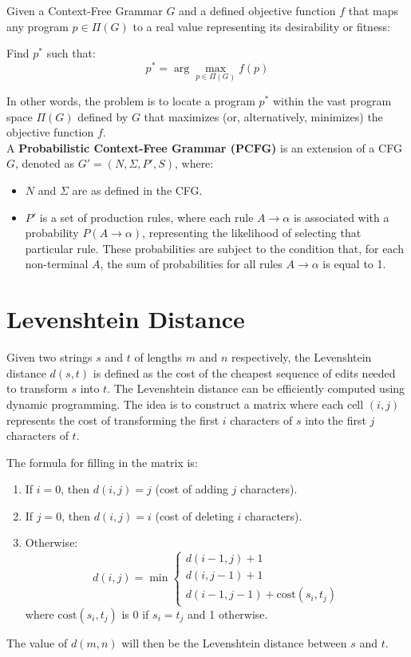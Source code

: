 Given a Context-Free Grammar \( G \) and a defined objective function \( f \) that maps any program \( p \in \Pi(G) \) to a real value representing its desirability or fitness:

Find \( p^* \) such that:
\[ p^* = \arg\max_{p \in \Pi(G)} f(p) \]

In other words, the problem is to locate a program \( p^* \) within the vast program space \( \Pi(G) \) defined by \( G \) that maximizes (or, alternatively, minimizes) the objective function \( f \). \\

\noindent A \textbf{Probabilistic Context-Free Grammar (PCFG)} is an extension of a CFG \( G \), denoted as \( G' = (N, \Sigma, P', S) \), where:

\begin{itemize}
    \item \( N \) and \( \Sigma \) are as defined in the CFG.
    \item \( P' \) is a set of production rules, where each rule \( A \rightarrow \alpha \) is associated with a probability \( P(A \rightarrow \alpha) \), representing the likelihood of selecting that particular rule. These probabilities are subject to the condition that, for each non-terminal \( A \), the sum of probabilities for all rules \( A \rightarrow \alpha \) is equal to 1.
\end{itemize}


\clearpage
\section{Levenshtein Distance}\label{app:levenshtein}
Given two strings \( s \) and \( t \) of lengths \( m \) and \( n \) respectively, the Levenshtein distance \( d(s, t) \) is defined as the cost of the cheapest sequence of edits needed to transform \( s \) into \( t \). 
The Levenshtein distance can be efficiently computed using dynamic programming. The idea is to construct a matrix where each cell \( (i, j) \) represents the cost of transforming the first \( i \) characters of \( s \) into the first \( j \) characters of \( t \). 

The formula for filling in the matrix is:
\begin{enumerate}
    \item If \( i = 0 \), then \( d(i, j) = j \) (cost of adding \( j \) characters).
    \item If \( j = 0 \), then \( d(i, j) = i \) (cost of deleting \( i \) characters).
    \item Otherwise:   \[
        d(i, j) = \min \begin{cases} 
        d(i-1, j) + 1 \\ 
        d(i, j-1) + 1 \\ 
        d(i-1, j-1) + \text{cost}(s_i, t_j) 
        \end{cases}
        \]
        where \( \text{cost}(s_i, t_j) \) is 0 if \( s_i = t_j \) and 1 otherwise.
\end{enumerate}

The value of \( d(m, n) \) will then be the Levenshtein distance between \( s \) and \( t \).